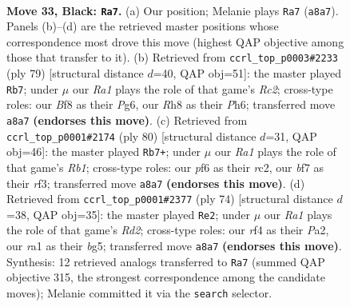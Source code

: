 \documentclass[11pt]{article}
\begin{document}
\clearpage

\begin{figure}[p]\centering
\begin{subfigure}{0.46\textwidth}\centering
\resizebox{\linewidth}{!}{%
\newchessgame
\chessboard[
  setfen={rk3b1r/5B2/p4P2/2P4p/1P3R2/8/8/R3K3 b Q - 0 33},
  showmover=false,
  pgfstyle=straightmove, color=movearrow, markmove={a8-a7}
]}
\caption{}
\end{subfigure}\hfill
\begin{subfigure}{0.46\textwidth}\centering
\resizebox{\linewidth}{!}{%
\newchessgame
\chessboard[
  setfen={8/2rk4/R1p3pp/6p1/P3P3/7P/3r2P1/2R3K1 b - - 0 40},
  showmover=false,
  pgfstyle=straightmove, color=movearrow, markmove={c7-b7}
]}
\caption{}
\end{subfigure}
\\[4pt]
\begin{subfigure}{0.46\textwidth}\centering
\resizebox{\linewidth}{!}{%
\newchessgame
\chessboard[
  setfen={8/3k4/5p2/4p3/7p/3P1r1P/2r5/1R1RB2K w - - 0 41},
  showmover=false,
  pgfstyle=straightmove, color=movearrow, markmove={b1-b7}
]}
\caption{}
\end{subfigure}\hfill
\begin{subfigure}{0.46\textwidth}\centering
\resizebox{\linewidth}{!}{%
\newchessgame
\chessboard[
  setfen={1r3r1k/6p1/2R3B1/6b1/4p3/P3P3/P2R2K1/8 w - - 1 38},
  showmover=false,
  pgfstyle=straightmove, color=movearrow, markmove={d2-e2}
]}
\caption{}
\end{subfigure}
\caption{\textbf{Move 33, Black: \texttt{Ra7}.} (a) Our position; Melanie plays \texttt{Ra7} (\texttt{a8a7}). Panels (b)--(d) are the retrieved master positions whose correspondence most drove this move (highest QAP objective among those that transfer to it). (b) Retrieved from \texttt{ccrl\_top\_p0003\#2233} (ply 79) [structural distance $d$=40, QAP obj=51]: the master played \texttt{Rb7}; under $\mu$ our \emph{Ra1} plays the role of that game's \emph{Rc2}; cross-type roles: our \emph{B}f8 as their \emph{P}g6, our \emph{R}h8 as their \emph{P}h6; transferred move \texttt{a8a7} \textbf{(endorses this move)}. (c) Retrieved from \texttt{ccrl\_top\_p0001\#2174} (ply 80) [structural distance $d$=31, QAP obj=46]: the master played \texttt{Rb7+}; under $\mu$ our \emph{Ra1} plays the role of that game's \emph{Rb1}; cross-type roles: our \emph{p}f6 as their \emph{r}c2, our \emph{b}f7 as their \emph{r}f3; transferred move \texttt{a8a7} \textbf{(endorses this move)}. (d) Retrieved from \texttt{ccrl\_top\_p0001\#2377} (ply 74) [structural distance $d$=38, QAP obj=35]: the master played \texttt{Re2}; under $\mu$ our \emph{Ra1} plays the role of that game's \emph{Rd2}; cross-type roles: our \emph{r}f4 as their \emph{P}a2, our \emph{r}a1 as their \emph{b}g5; transferred move \texttt{a8a7} \textbf{(endorses this move)}. Synthesis: 12 retrieved analogs transferred to \texttt{Ra7} (summed QAP objective 315, the strongest correspondence among the candidate moves); Melanie committed it via the \texttt{search} selector.}
\label{fig:thought-m65}
\end{figure}
\end{document}
